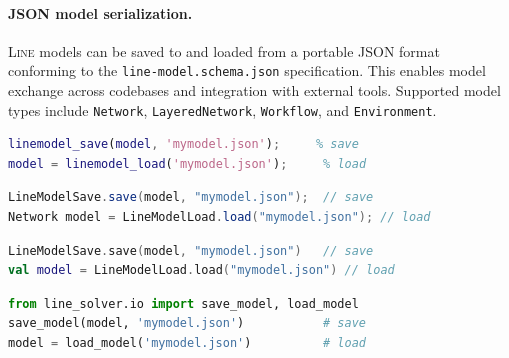 \paragraph{JSON model serialization.}
\textsc{Line} models can be saved to and loaded from a portable JSON format conforming to the \texttt{line-model.schema.json} specification.  This enables model exchange across codebases and integration with external tools.  Supported model types include \texttt{Network}, \texttt{LayeredNetwork}, \texttt{Workflow}, and \texttt{Environment}.
\begin{MATLAB}
\begin{lstlisting}[language = matlab]
linemodel_save(model, 'mymodel.json');     % save
model = linemodel_load('mymodel.json');     % load
\end{lstlisting}
\end{MATLAB}
\begin{JAVA}
\begin{lstlisting}[language=java, basicstyle=\ttfamily\scriptsize]
LineModelSave.save(model, "mymodel.json");  // save
Network model = LineModelLoad.load("mymodel.json"); // load
\end{lstlisting}
\end{JAVA}
\begin{KOTLIN}
\begin{lstlisting}[language=kotlin, basicstyle=\ttfamily\scriptsize]
LineModelSave.save(model, "mymodel.json")   // save
val model = LineModelLoad.load("mymodel.json") // load
\end{lstlisting}
\end{KOTLIN}
\begin{PYTHON}
\begin{lstlisting}[language=python]
from line_solver.io import save_model, load_model
save_model(model, 'mymodel.json')           # save
model = load_model('mymodel.json')          # load
\end{lstlisting}
\end{PYTHON}

